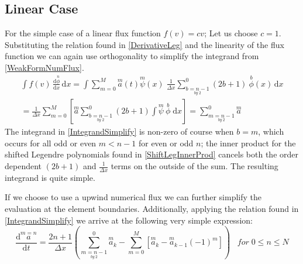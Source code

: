 \documentclass[letterpaper]{article}
\begin{document}
\subsection{Linear Case}
For the simple case of a linear flux function $f(v) = cv$; Let us choose $c=1$. Substituting the relation found in \eqref{DerivativeLeg} and the linearity of the flux function we can again use orthogonality to simplify the integrand from \eqref{WeakFormNumFlux}.
	\begin{equation}\label{IntegrandSimplify}
	\begin{split}
	\int\! f(v) \,\frac{\mathrm{d} \overset{n}{\phi}}{\mathrm{d} x} \,\mathrm{d}x
	= \int \sum_{m=0}^M \overset{m}{a}(t)\overset{m}{\psi}(x) \;\frac{1}{\Delta x} \sum_{\underset{by \; 2}{b=n-1}}^0 (2b+1) \:\overset{b}{\phi}(x) \,\mathrm{d}x \\
	=\frac{1}{\Delta x} \sum_{m=0}^M \left[\overset{m}{a} \sum_{\underset{by \; 2}{b=n-1}}^0 (2b+1) \int \overset{m}{\psi} \:\overset{b}{\phi} \;\mathrm{d}x \right]
	=\sum_{\underset{by \: 2}{m=n-1}}^0 \overset{m}{a}
	\end{split}
	\end{equation}
The integrand in \eqref{IntegrandSimplify} is non-zero of course when $b=m$, which occurs for all odd or even $m<n-1$ for even or odd $n$; the inner product for the shifted Legendre polynomials found in \eqref{ShiftLegInnerProd} cancels both the order dependent $(2b+1)$ and $\frac{1}{\Delta x}$ terms on the outside of the sum. The resulting integrand is quite simple.

If we choose to use a upwind numerical flux we can further simplify the evaluation at the element boundaries. Additionally, applying the relation found in \eqref{IntegrandSimplify} we arrive at the following very simple expression:
	\begin{equation}\label{WeakFormLinear}
	\frac{\mathrm{d}\overset{m=n}{a}}{\mathrm{d} t}
	=\frac{2n+1}{\Delta x} \left( \sum_{\underset{by \: 2}{m=n-1}}^0 \overset{m}{a}_k
	-\sum_{m=0}^M \left[ \overset{m}{a}_k - \overset{m}{a}_{k-1}(-1)^m \right]\right)
	\;\;\; for \; 0 \leq n \leq N
	\end{equation}
\end{document}
